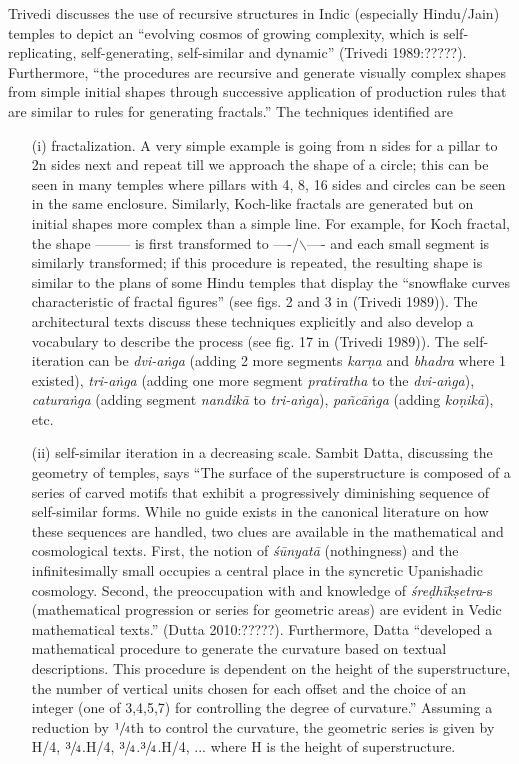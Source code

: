 Trivedi discusses the use of recursive structures in Indic (especially Hindu/Jain) temples to depict an “evolving cosmos of growing complexity, which is self-replicating, self-generating, self-similar and dynamic” (Trivedi 1989:?????). Furthermore, “the procedures are recursive and generate visually complex shapes from simple initial shapes through successive application of production rules that are similar to rules for generating fractals.” The techniques identified are 
\begin{itemize}
\item[(i)] fractalization. A very simple example is going from n sides for a pillar to 2n sides next and repeat till we approach the shape of a circle; this can be seen in many temples where pillars with 4, 8, 16 sides and circles can be seen in the same enclosure. Similarly, Koch-like fractals are generated but on initial shapes more complex than a simple line. For example, for Koch fractal, the shape -------- is first transformed to ----/$\backslash$---- and each small segment is similarly transformed; if this procedure is repeated, the resulting shape is similar to the plans of some Hindu temples that display the “snowflake curves characteristic of fractal figures” (see figs. 2 and 3 in (Trivedi 1989)). The architectural texts discuss these techniques explicitly and also develop a vocabulary to describe the process (see fig. 17 in (Trivedi 1989)). The self-iteration can be \textsl{dvi-aṅga} (adding 2 more segments \textsl{karṇa} and \textsl{bhadra} where 1 existed), \textsl{tri-aṅga} (adding one more segment \textsl{pratiratha} to the \textsl{dvi-aṅga}), \textsl{caturaṅga} (adding segment \textsl{nandikā} to \textsl{tri-aṅga}), \textsl{pañcāṅga} (adding \textsl{koṇikā}), etc. 

\item[(ii)] self-similar iteration in a decreasing scale. Sambit Datta, discussing the geometry of temples, says “The surface of the superstructure is composed of a series of carved motifs that exhibit a progressively diminishing sequence of self-similar forms. While no guide exists in the canonical literature on how these sequences are handled, two clues are available in the mathematical and cosmological texts. First, the notion of \textsl{śūnyatā} (nothingness) and the infinitesimally small occupies a central place in the syncretic Upanishadic cosmology. Second, the preoccupation with and knowledge of \textsl{śreḍhīkṣetra}-s (mathematical progression or series for geometric areas) are evident in Vedic mathematical texts.” (Dutta 2010:?????). Furthermore, Datta “developed a mathematical procedure to generate the curvature based on textual descriptions. This procedure is dependent on the height of the superstructure, the number of vertical units chosen for each offset and the choice of an integer (one of 3,4,5,7) for controlling the degree of curvature.” Assuming a reduction by $\sfrac{1}{4}$th to control the curvature, the geometric series is given by H/4, $\sfrac{3}{4}$.H/4, $\sfrac{3}{4}$.$\sfrac{3}{4}$.H/4, ... where H is the height of superstructure.


\end{itemize}
